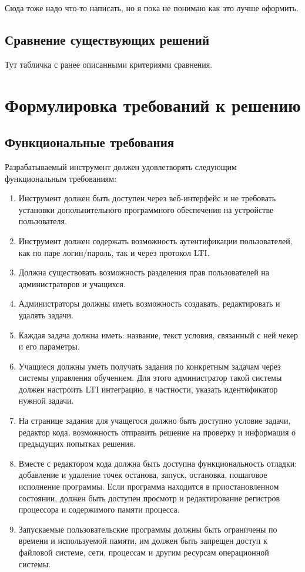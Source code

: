 \documentclass[a4paper,article,14pt]{extarticle}
\begin{document}
Сюда тоже надо что-то написать, но я пока не понимаю как это лучше оформить.

\subsection{Сравнение существующих решений}

Тут табличка с ранее описанными критериями сравнения.

\section{Формулировка требований к решению}

\subsection{Функциональные требования}

Разрабатываемый инструмент должен удовлетворять следующим функциональным требованиям:

\begin{enumerate}
    \item Инструмент должен быть доступен через веб-интерфейс и не требовать установки допольнительного программного обеспечения на устройстве пользователя.
    \item Инструмент должен содержать возможность аутентификации пользователей, как по паре логин/пароль, так и через протокол LTI.
    \item Должна существовать возможность разделения прав пользователей на администраторов и учащихся.
    \item Администраторы должны иметь возможность создавать, редактировать и удалять задачи.
    \item Каждая задача должна иметь: название, текст условия, связанный с ней чекер и его параметры.
    \item Учащиеся должны уметь получать задания по конкретным задачам через системы управления обучением. Для этого администратор такой системы должен настроить LTI интеграцию, в частности, указать идентификатор нужной задачи.
    \item На странице задания для учащегося должно быть доступно условие задачи, редактор кода, возможность отправить решение на проверку и информация о предыдущих попытках решения.
    \item Вместе с редактором кода должна быть доступна функциональность отладки: добавление и удаление точек останова, запуск, остановка, пошаговое исполнение программы. Если программа находится в приостановленном состоянии, должен быть доступен просмотр и редактирование регистров процессора и содержимого памяти процесса.
    \item Запускаемые пользовательские программы должны быть ограничены по времени и используемой памяти, им должен быть запрещен доступ к файловой системе, сети, процессам и другим ресурсам операционной системы.
\end{enumerate}
\end{document}
